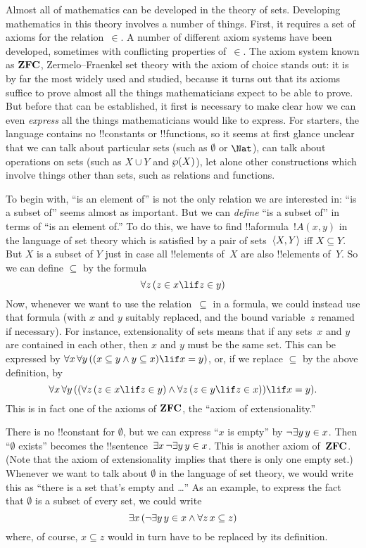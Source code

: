 \documentclass[../../../include/open-logic-section]{subfiles}
\begin{document}


Almost all of mathematics can be developed in the theory of sets.
Developing mathematics in this theory involves a number of things.
First, it requires a set of axioms for the relation~$\in$.  A number
of different axiom systems have been developed, sometimes with
conflicting properties of~$\in$.  The axiom system known as
$\Log{ZFC}$, Zermelo--Fraenkel set theory with the axiom of choice
stands out: it is by far the most widely used and studied, because it
turns out that its axioms suffice to prove almost all the things
mathematicians expect to be able to prove.  But before that can be
established, it first is necessary to make clear how we can even
\emph{express} all the things mathematicians would like to express.
For starters, the language contains no !!{constant}s or !!{function}s,
so it seems at first glance unclear that we can talk about particular
sets (such as $\emptyset$ or $\Nat$), can talk about operations on
sets (such as $X \cup Y$ and $\wp(X)$), let alone other
constructions which involve things other than sets, such as relations
and functions.

To begin with, ``is an element of'' is not the only relation we are
interested in: ``is a subset of'' seems almost as important.  But we
can \emph{define} ``is a subset of'' in terms of ``is an element of.''
To do this, we have to find !!a{formula}~$!A(x, y)$ in
the language of set theory which is satisfied by a pair of
sets~$\langle X, Y \rangle$ iff $X \subseteq Y$.  But $X$ is a subset of $Y$
just in case all !!{element}s of~$X$ are also !!{element}s of~$Y$.  So
we can define $\subseteq$ by the formula
\[
\lforall[z][(z \in x \lif z \in y)]
\]
Now, whenever we want to use the relation~$\subseteq$ in a formula, we
could instead use that formula (with $x$ and $y$ suitably replaced,
and the bound variable~$z$ renamed if necessary).  For instance,
extensionality of sets means that if any sets~$x$ and $y$ are
contained in each other, then $x$ and $y$ must be the same set. This
can be expressed by $\lforall[x][\lforall[y][((x \subseteq y \land y
    \subseteq x) \lif x = y)]]$, or, if we replace $\subseteq$ by the
above definition, by
\[
\lforall[x][\lforall[y][((\lforall[z][(z \in x \lif z \in y)] \land
    \lforall[z][(z \in y \lif z \in x)]) \lif x = y)]].
\]
This is in fact one of the axioms of $\Log{ZFC}$, the ``axiom of
extensionality.''

There is no !!{constant} for $\emptyset$, but we can express ``$x$ is
empty'' by $\lnot \lexists[y][y \in x]$.  Then ``$\emptyset$ exists''
becomes the !!{sentence}~$\lexists[x][\lnot \lexists[y][y \in
    x]]$. This is another axiom of~$\Log{ZFC}$.  (Note that the axiom
of extensionality implies that there is only one empty set.)  Whenever
we want to talk about $\emptyset$ in the language of set theory, we
would write this as ``there is a set that's empty and \dots'' As an
example, to express the fact that $\emptyset$ is a subset of every
set, we could write
\[
\lexists[x][(\lnot\lexists[y][y \in x] \land \lforall[z][x \subseteq
    z])]
\]
where, of course, $x \subseteq z$ would in turn have to be replaced by
its definition.
\end{document}
